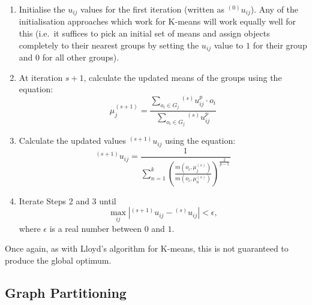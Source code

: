 \begin{enumerate}

\item Initialise the $u_{ij}$ values for the first iteration (written as ${}^{(0)}u_{ij}$). Any of the initialisation approaches which work for K-means will work equally well for this (i.e.~it suffices to pick an initial set of means and assign objects completely to their nearest groups by setting the $u_{ij}$ value to $1$ for their group and $0$ for all other groups).

\item At iteration $s+1$, calculate the updated means of the groups using the equation:
%
\[
\mu_j^{(s+1)} = \frac{\displaystyle \sum_{o_i \in G_j} {}^{(s)}u_{ij}^p \cdot o_i}{\displaystyle \sum_{o_i \in G_j} {}^{(s)}u_{ij}^p}
\]

\item Calculate the updated values ${}^{(s+1)}u_{ij}$ using the equation:
%
\[
{}^{(s+1)}u_{ij} = \frac{1}{\displaystyle \sum_{n=1}^k \left( \frac{m(o_i, \mu_j^{(s)})}{m(o_i, \mu_n^{(s)})} \right)^{\frac{2}{p-1}}}
\]

\item Iterate Steps 2 and 3 until
%
\[
\max_{ij} |{}^{(s+1)}u_{ij} - {}^{(s)}u_{ij}| < \epsilon,
\]
%
where $\epsilon$ is a real number between $0$ and $1$.

\end{enumerate}

\noindent Once again, as with Lloyd's algorithm for K-means, this is not guaranteed to produce the global optimum.


\subsection{Graph Partitioning}
\label{subsec:graphpartitioning}


